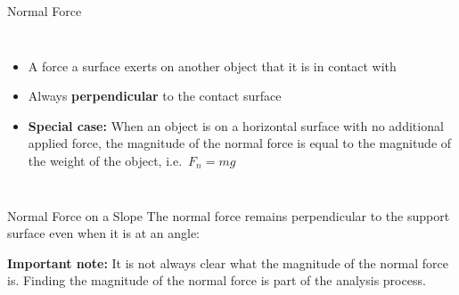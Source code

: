 \documentclass[12pt,compress,aspectratio=169]{beamer}
\begin{document}
\begin{frame}{Normal Force}
  \begin{columns}
    \centering
    
    \begin{itemize}
    \item A force a surface exerts on another object that it is in contact with
    \item Always \textbf{perpendicular} to the contact surface
    \item\textbf{Special case:} When an object is on a horizontal surface
      with no additional applied force, the magnitude of the normal force is
      equal to the magnitude of the weight of the object, i.e.\ $F_n=mg$
    \end{itemize}
  \end{columns}
\end{frame}



\begin{frame}{Normal Force on a Slope}
  The normal force remains perpendicular to the support surface even when it is
  at an angle:
  \begin{center}
  \end{center}
  \textbf{Important note:} It is not always clear what the magnitude of the
  normal force is. Finding the magnitude of the normal force is part of the
  analysis process.
\end{frame}
\end{document}
